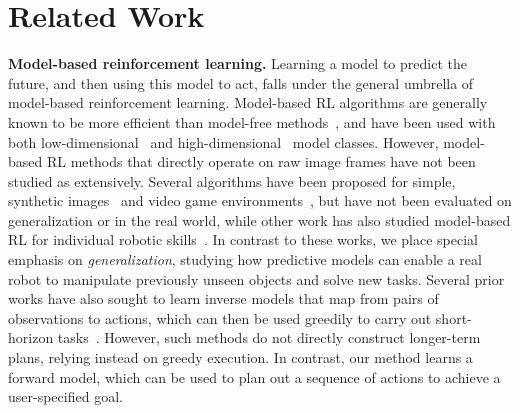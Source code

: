\section{Related Work}\label{sec:rel_work}


\noindent \textbf{Model-based reinforcement learning.} Learning a model to predict the future, and then using this model to act, falls under the general umbrella of model-based reinforcement learning. Model-based RL algorithms are generally known to be more efficient than model-free methods~\cite{deisenroth2013survey}, and have been used with both low-dimensional~\cite{deisenroth2011pilco} and high-dimensional~\cite{deep_mpc} model classes. However, model-based RL methods that directly operate on raw image frames have not been studied as extensively. Several algorithms have been proposed for simple, synthetic images~\cite{watter2015embed} and video game environments~\cite{alexey, ha2018world, atarioh}, but have not been evaluated on generalization or in the real world, while other work has also studied model-based RL for individual robotic skills~\cite{dsae,zhang2018solar}. In contrast to these works, we place special emphasis on \emph{generalization}, studying how predictive models can enable a real robot to manipulate previously unseen objects and solve new tasks.
Several prior works have also sought to learn inverse models that map from pairs of observations to actions, which can then be used greedily to carry out short-horizon tasks~\cite{agrawal2016learning,nair2017combining}. However, such methods do not directly construct longer-term plans, relying instead on greedy execution. In contrast, our method learns a forward model, which can be used to plan out a sequence of actions to achieve a user-specified goal.

